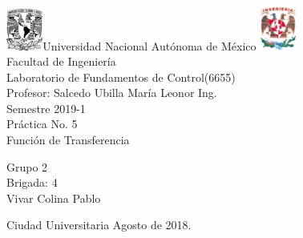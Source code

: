 

\begin{titlepage}
     \begin{center}
	\includegraphics[width=0.09\textwidth]{UNAM}\Large Universidad Nacional Autónoma de México
        	\includegraphics[width=0.09\textwidth]{FI}\\[1cm]
        \Large Facultad de Ingeniería\\[1cm]
         \Large Laboratorio de Fundamentos de Control(6655)\\[1cm]
         \footnotesize Profesor: Salcedo Ubilla María Leonor Ing.\\[1cm]
        \footnotesize Semestre 2019-1\\[1cm]
        
       

        \Large Práctica No. 5\\[1cm]
        
           

\Large Función de Transferencia
        
          \begin{flushright}
\footnotesize  Grupo 2\\[0.5cm]
\footnotesize Brigada: 4\\[0.5cm]
\footnotesize Vivar Colina Pablo\\[0.5cm]
 \end{flushright}
          \begin{flushleft}
        \footnotesize Ciudad Universitaria Agosto de 2018.\\
          \end{flushleft}
         
          
   \end{center}
\end{titlepage}

